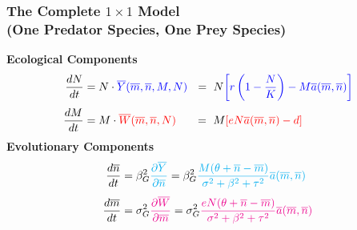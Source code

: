 \documentclass[10pt]{beamer}
\begin{document}
\begin{frame}
	\frametitle{The Complete $1\times1$ Model \\ (One Predator Species, One Prey Species)}
	{\bf Ecological Components}
	\begin{align*}
	\frac{dN}{dt} &= N\cdot {\color{blue}\overline{Y}(\overline{m}, \overline{n}, M, N)}\ \ =\ N{\color{blue}\left[r\left(1 - \frac{N}{K}\right) - M\overline{a}(\overline{m}, \overline{n})\right]}\\[.1cm]
	\frac{dM}{dt} &= M\cdot {\color{red}\overline{W}(\overline{m}, \overline{n}, N)}\ \ \ \ \ =\ M{\color{red}\left[eN\overline{a}(\overline{m}, \overline{n}) - d\right]}
	\end{align*}
	{\bf Evolutionary Components}
	\begin{align*}
	\frac{d\overline{n}}{dt} &= \beta_G^2{\color{cyan}\frac{\partial \overline{Y}}{\partial \overline{n}}} = \beta_G^2{\color{cyan}\frac{M(\theta + \overline{n} - \overline{m})}{\sigma^2 + \beta^2 + \tau^2} \overline{a}(\overline{m}, \overline{n})}\\[.1cm]
	\frac{d\overline{m}}{dt} &= \sigma_G^2{\color{magenta}\frac{\partial \overline{W}}{\partial \overline{m}}} = \sigma_G^2{\color{magenta}\frac{eN(\theta + \overline{n} - \overline{m})}{\sigma^2 + \beta^2 + \tau^2} \overline{a}(\overline{m}, \overline{n})}
	\end{align*}
\end{frame}
\end{document}
